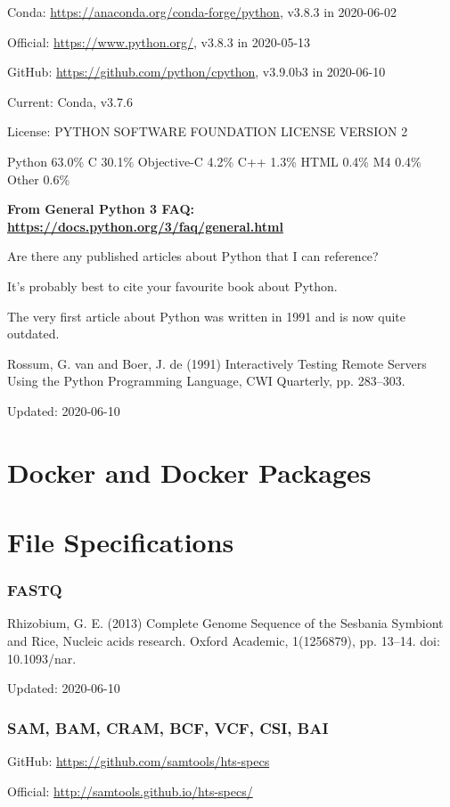 \documentclass[]{article}
\begin{document}
Conda: \url{https://anaconda.org/conda-forge/python}, v3.8.3 in 2020-06-02

Official: \url{https://www.python.org/}, v3.8.3 in 2020-05-13

GitHub: \url{https://github.com/python/cpython}, v3.9.0b3 in 2020-06-10

Current: Conda, v3.7.6

License: PYTHON SOFTWARE FOUNDATION LICENSE VERSION 2

Python 63.0\% C 30.1\% Objective-C 4.2\% C++ 1.3\% HTML 0.4\% M4 0.4\% Other 0.6\% 

\textbf{From General Python 3 FAQ: \url{https://docs.python.org/3/faq/general.html}}

Are there any published articles about Python that I can reference?

It's probably best to cite your favourite book about Python.

The very first article about Python was written in 1991 and is now quite outdated.

Rossum, G. van and Boer, J. de (1991) Interactively Testing Remote Servers Using the Python Programming Language, CWI Quarterly, pp. 283–303.

Updated: 2020-06-10

\part{Docker and Docker Packages}

\part{File Specifications}
\section{FASTQ}

Rhizobium, G. E. (2013) Complete Genome Sequence of the Sesbania Symbiont and Rice, Nucleic acids research. Oxford Academic, 1(1256879), pp. 13–14. doi: 10.1093/nar.

Updated: 2020-06-10


\section{SAM, BAM, CRAM, BCF, VCF, CSI, BAI}

GitHub: \url{https://github.com/samtools/hts-specs}

Official: \url{http://samtools.github.io/hts-specs/}
\end{document}
